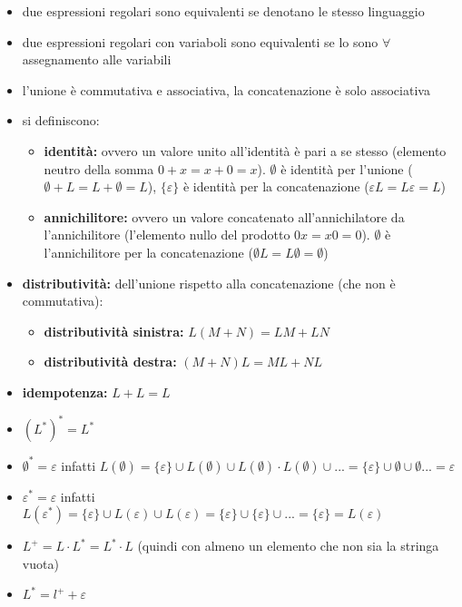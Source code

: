 \documentclass[a4paper,12pt, oneside]{book}
\begin{document}
\begin{itemize}
	\item due espressioni regolari sono equivalenti se denotano le stesso linguaggio
	\item due espressioni regolari con variaboli sono equivalenti se lo sono $\forall$ assegnamento alle variabili
	\item l'unione è commutativa e associativa, la concatenazione è solo associativa
	\item si definiscono:
	      \begin{itemize}
		      \item \textbf{identità:} ovvero un valore unito all'identità è pari a se stesso (elemento neutro della somma $0+x=x+0=x$). $\emptyset$ è identità per l'unione ($\emptyset+L=L+\emptyset=L$), $\{\varepsilon\}$ è identità per la concatenazione ($\varepsilon L=L\varepsilon=L$)
		      \item \textbf{annichilitore:} ovvero un valore concatenato all'annichilatore da l'annichilitore (l'elemento nullo del prodotto $0x=x0=0$).  $\emptyset$ è l'annichilitore per la concatenazione ($\emptyset L=L\emptyset=\emptyset$)
	      \end{itemize}
	\item \textbf{distributività:} dell'unione rispetto alla concatenazione (che non è commutativa):
	      \begin{itemize}
		      \item \textbf{distributività sinistra:} $L(M+N)=LM+LN$
		      \item \textbf{distributività destra:} $(M+N)L=ML+NL$
	      \end{itemize}
	\item \textbf{idempotenza:} $L+L=L$
	\item $(L^*)^*=L^*$
	\item $\emptyset^*=\varepsilon$ infatti $L(\emptyset)=\{\varepsilon\}\cup L(\emptyset)\cup L(\emptyset)\cdot L(\emptyset)\cup...=\{\varepsilon\}\cup \emptyset\cup \emptyset...=\varepsilon$
	\item $\varepsilon^*=\varepsilon$ infatti $L(\varepsilon^*)=\{\varepsilon\}\cup L(\varepsilon)\cup L(\varepsilon)=\{\varepsilon\}\cup \{\varepsilon\}\cup ...=\{\varepsilon\}=L(\varepsilon)$
	\item $L^+=L\cdot L^*=L^*\cdot L$ (quindi con almeno un elemento che non sia la stringa vuota)
	\item $L^*=l^++\varepsilon$
\end{itemize}
\end{document}
